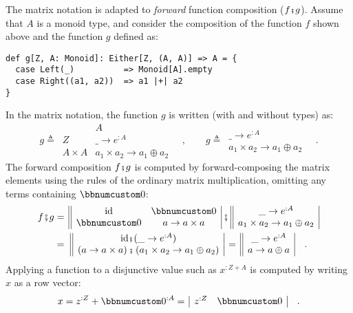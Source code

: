 The matrix notation is adapted to \emph{forward} function composition
($f\bef g$). Assume that $A$ is a monoid type, and consider the
composition of the function $f$ shown above and the function $g$
defined as:
\begin{lstlisting}
def g[Z, A: Monoid]: Either[Z, (A, A)] => A = {
  case Left(_)          => Monoid[A].empty
  case Right((a1, a2))  => a1 |+| a2
}
\end{lstlisting}
In the matrix notation, the function $g$ is written (with and without
types) as:
\[
g\triangleq\,\begin{array}{|c||c|}
 & A\\
\hline Z & \_\rightarrow e^{:A}\\
A\times A & a_{1}\times a_{2}\rightarrow a_{1}\oplus a_{2}
\end{array}\quad,\quad\quad g\triangleq\,\begin{array}{||c|}
\_\rightarrow e^{:A}\\
a_{1}\times a_{2}\rightarrow a_{1}\oplus a_{2}
\end{array}\quad.
\]
The forward composition $f\bef g$ is computed by forward-composing
the matrix elements using the rules of the ordinary matrix multiplication,
omitting any terms containing $\bbnum 0$:
\begin{align*}
f\bef g & =\,\begin{array}{||cc|}
\text{id} & \bbnum 0\\
\bbnum 0 & a\rightarrow a\times a
\end{array}\,\bef\,\begin{array}{||c|}
\_\rightarrow e^{:A}\\
a_{1}\times a_{2}\rightarrow a_{1}\oplus a_{2}
\end{array}\\
 & =\,\,\begin{array}{||c|}
\text{id}\bef(\_\rightarrow e^{:A})\\
\left(a\rightarrow a\times a\right)\bef\left(a_{1}\times a_{2}\rightarrow a_{1}\oplus a_{2}\right)
\end{array}\,=\,\begin{array}{||c|}
\_\rightarrow e^{:A}\\
a\rightarrow a\oplus a
\end{array}\quad.
\end{align*}
Applying a function to a disjunctive value such as $x^{:Z+A}$ is
computed by writing $x$ as a row vector:
\[
x=z^{:Z}+\bbnum 0^{:A}=\,\begin{array}{|cc|}
z^{:Z} & \bbnum 0\end{array}\quad.
\]
